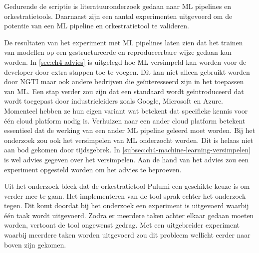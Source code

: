 Gedurende de scriptie is literatuuronderzoek gedaan naar ML pipelines en orkestratietools. Daarnaast zijn een aantal experimenten uitgevoerd om de potentie van een ML pipeline en orkestratietool te valideren. 

De resultaten van het experiment met ML pipelines laten zien dat het trainen van modellen op een gestructureerde en reproduceerbare wijze gedaan kan worden. In \autoref{sec:ch4-advies} is uitgelegd hoe ML versimpeld kan worden voor de developer door extra stappen toe te voegen. Dit kan niet alleen gebruikt worden door NGTI maar ook andere bedrijven die geïnteresseerd zijn in het toepassen van ML. Een stap verder zou zijn dat een standaard wordt geïntroduceerd dat wordt toegepast door industrieleiders zoals Google, Microsoft en Azure. Momenteel hebben ze hun eigen variant wat betekent dat specifieke kennis voor één cloud platform nodig is. Verhuizen naar een ander cloud platform betekent essentieel dat de werking van een ander ML pipeline geleerd moet worden. Bij het onderzoek zou ook het versimpelen van ML onderzocht worden. Dit is helaas niet aan bod gekomen door tijdsgebrek. In \autoref{subsec:ch4-machine-learning-versimpelen} is wel advies gegeven over het versimpelen. Aan de hand van het advies zou een experiment opgesteld worden om het advies te beproeven.

Uit het onderzoek bleek dat de orkestratietool Pulumi een geschikte keuze is om verder mee te gaan. Het implementeren van de tool sprak echter het onderzoek tegen. Dit komt doordat bij het onderzoek een experiment is uitgevoerd waarbij één taak wordt uitgevoerd. Zodra er meerdere taken achter elkaar gedaan moeten worden, vertoont de tool ongewenst gedrag. Met een uitgebreider experiment waarbij meerdere taken worden uitgevoerd zou dit probleem wellicht eerder naar boven zijn gekomen.
